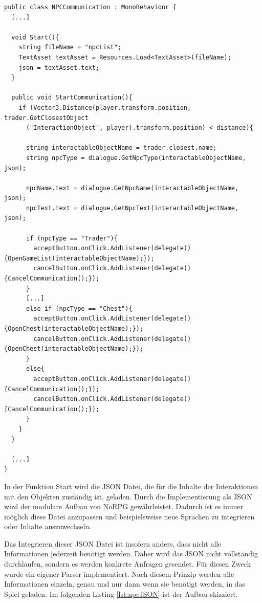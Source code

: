 	\begin{scriptsize}
		\lstset{
			float,
			caption=Skript: NPCCommunication.cs, 
			language=[Sharp]C, 
			frame=single,  
			showstringspaces=false, 
			showspaces=false, 
			numbers=left, 
			captionpos=b, 
			belowcaptionskip=4pt,
			basicstyle=\ttfamily
		} 
		\begin{lstlisting}[label=lst:npcComm]
public class NPCCommunication : MonoBehaviour {
  [...]
	
  void Start(){
    string fileName = "npcList";
    TextAsset textAsset = Resources.Load<TextAsset>(fileName);
    json = textAsset.text;
  }

  public void StartCommunication(){
    if (Vector3.Distance(player.transform.position, trader.GetClosestObject
      ("InteractionObject", player).transform.position) < distance){
		
      string interactableObjectName = trader.closest.name;
      string npcType = dialogue.GetNpcType(interactableObjectName, json);

      npcName.text = dialogue.GetNpcName(interactableObjectName, json);
      npcText.text = dialogue.GetNpcText(interactableObjectName, json);

      if (npcType == "Trader"){
        acceptButton.onClick.AddListener(delegate(){OpenGameList(interactableObjectName);});
        cancelButton.onClick.AddListener(delegate(){CancelCommunication();});
      }
      [...]
      else if (npcType == "Chest"){
        acceptButton.onClick.AddListener(delegate(){OpenChest(interactableObjectName);});
        cancelButton.onClick.AddListener(delegate(){OpenChest(interactableObjectName);});
      }
      else{
        acceptButton.onClick.AddListener(delegate(){CancelCommunication();});
        cancelButton.onClick.AddListener(delegate(){CancelCommunication();});
      }
    }
  }
		
  [...]
}
		\end{lstlisting}
	\end{scriptsize}
	
			\label{npctext}
			In der Funktion Start wird die \ac{JSON} Datei, die für die Inhalte der Interaktionen mit den Objekten zuständig ist, geladen. Durch die Implementierung als \ac{JSON} wird der modulare Aufbau von NoRPG gewährleistet. Dadurch ist es immer möglich diese Datei anzupassen und beispielsweise neue Sprachen zu integrieren oder Inhalte auszuwechseln. 
	
			Das Integrieren dieser \ac{JSON} Datei ist insofern anders, dass nicht alle Informationen jederzeit benötigt werden. Daher wird das \ac{JSON} nicht vollständig durchlaufen, sondern es werden konkrete Anfragen gesendet. Für diesen Zweck wurde ein eigener Parser implementiert. Nach diesem Prinzip werden alle Informationen einzeln, genau und nur dann wenn sie benötigt werden, in das Spiel geladen. Im folgenden Listing \ref{lst:npcJSON} ist der Aufbau skizziert.
	
